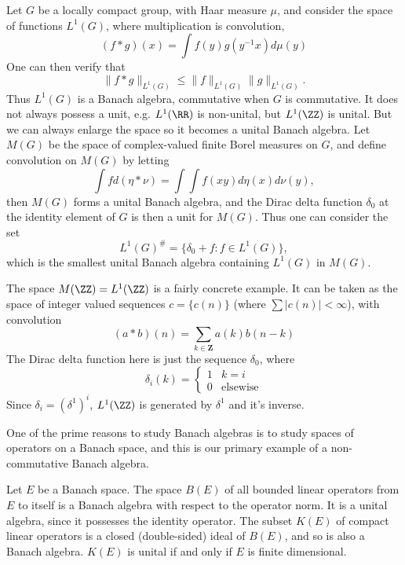 \begin{example}
    Let $G$ be a locally compact group, with Haar measure $\mu$, and consider the space of functions $L^1(G)$, where multiplication is convolution,
    \[ (f * g)(x) = \int f(y) g(y^{-1}x) d\mu(y) \]
    One can then verify that
    \[ \| f * g \|_{L^1(G)} \leq \| f \|_{L^1(G)} \| g \|_{L^1(G)}. \]
    Thus $L^1(G)$ is a Banach algebra, commutative when $G$ is commutative. It does not always possess a unit, e.g. $L^1(\RR)$ is non-unital, but $L^1(\ZZ)$ is unital. But we can always enlarge the space so it becomes a unital Banach algebra. Let $M(G)$ be the space of complex-valued finite Borel measures on $G$, and define convolution on $M(G)$ by letting
    \[ \int f d (\eta * \nu) = \int \int f(xy) d\eta(x) d\nu(y), \]
    then $M(G)$ forms a unital Banach algebra, and the Dirac delta function $\delta_0$ at the identity element of $G$ is then a unit for $M(G)$. Thus one can consider the set
    \[ L^1(G)^\# = \{ \delta_0 + f : f \in L^1(G) \}, \]
    which is the smallest unital Banach algebra containing $L^1(G)$ in $M(G)$.

    The space $M(\ZZ) = L^1(\ZZ)$ is a fairly concrete example. It can be taken as the space of integer valued sequences $c = \{ c(n) \}$ (where $\sum |c(n)| < \infty$), with convolution
    \[ (a * b)(n) = \sum_{k \in \mathbf{Z}} a(k) b(n-k) \]
    The Dirac delta function here is just the sequence $\delta_0$, where
    \[ \delta_i(k) = \begin{cases} 1 & k = i \\ 0 & \text{elsewise} \end{cases} \]
    Since $\delta_i = (\delta^1)^i$, $L^1(\ZZ)$ is generated by $\delta^1$ and it's inverse.
\end{example}

One of the prime reasons to study Banach algebras is to study spaces of operators on a Banach space, and this is our primary example of a non-commutative Banach algebra.

\begin{example}
    Let $E$ be a Banach space. The space $B(E)$ of all bounded linear operators from $E$ to itself is a Banach algebra with respect to the operator norm. It is a unital algebra, since it possesses the identity operator. The subset $K(E)$ of compact linear operators is a closed (double-sided) ideal of $B(E)$, and so is also a Banach algebra. $K(E)$ is unital if and only if $E$ is finite dimensional.
\end{example}

